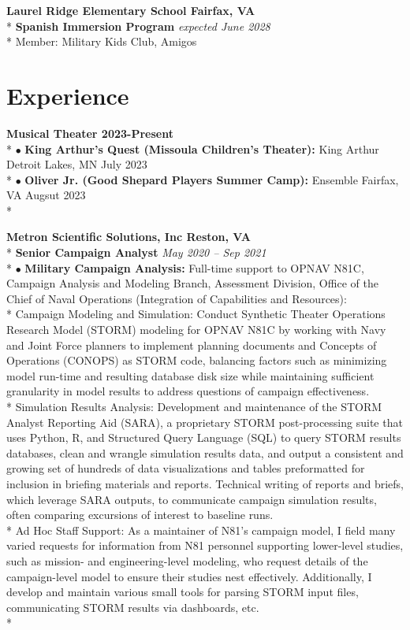 \documentclass{article}
\begin{document}
\noindent \textbf{Laurel Ridge Elementary School \hfill Fairfax, VA} \\*
\textbf{Spanish Immersion Program} \hfill \textit{expected June 2028} \\*
\textendash Member: Military Kids Club, Amigos 

\section{Experience}
\noindent \textbf{Musical Theater \hfill 2023-Present} \\*
$\bullet$ \textbf{King Arthur's Quest (Missoula Children's Theater):} King Arthur \hfill Detroit Lakes, MN \textendash  July 2023 \\*
$\bullet$ \textbf{Oliver Jr. (Good Shepard Players Summer Camp):} Ensemble \hfill Fairfax, VA \textendash  Augsut 2023\\*


\noindent \textbf{Metron Scientific Solutions, Inc \hfill Reston, VA} \\*
\textbf{Senior Campaign Analyst} \hfill \textit{May 2020 -- Sep 2021} \\*
$\bullet$ \textbf{Military Campaign Analysis:} Full-time support to OPNAV N81C, Campaign Analysis and Modeling Branch, Assessment Division, Office of the Chief of Naval Operations (Integration of Capabilities and Resources):\\*
\indent \textendash Campaign Modeling and Simulation: Conduct Synthetic Theater Operations Research Model (STORM) modeling for OPNAV N81C by working with Navy and Joint Force planners to implement planning documents and Concepts of Operations (CONOPS) as STORM code, balancing factors such as minimizing model run-time and resulting database disk size while maintaining sufficient granularity in model results to address questions of campaign effectiveness.\\*
\indent \textendash Simulation Results Analysis: Development and maintenance of the STORM Analyst Reporting Aid (SARA), a proprietary STORM post-processing suite that uses Python, R, and Structured Query Language (SQL) to query STORM results databases, clean and wrangle simulation results data, and output a consistent and growing set of hundreds of data visualizations and tables preformatted for inclusion in briefing materials and reports. Technical writing of reports and briefs, which leverage SARA outputs, to communicate campaign simulation results, often comparing excursions of interest to baseline runs. \\*
\indent \textendash Ad Hoc Staff Support: As a maintainer of N81's campaign model, I field many varied requests for information from N81 personnel supporting lower-level studies, such as mission- and engineering-level modeling, who request details of the campaign-level model to ensure their studies nest effectively. Additionally, I develop and maintain various small tools for parsing STORM input files, communicating STORM results via dashboards, etc. \\*
\end{document}
